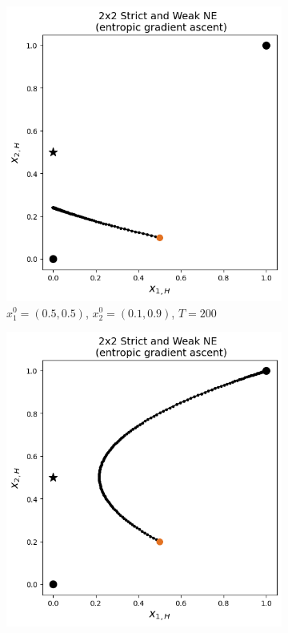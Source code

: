 \begin{figure}[H]
\captionsetup{justification=centering}
\centering
\begin{subfigure}{.5\textwidth}
    \centering
    \includegraphics[width=\textwidth]{logos/Weak5.png}
    \caption{$x_{1}^0 = (0.5,0.5)$, $x_{2}^0 = (0.1,0.9)$, $T = 200$}
    \label{fig:Weak3a}
\end{subfigure}%
\begin{subfigure}{.5\textwidth}
    \centering
    \includegraphics[width=\textwidth]{logos/Weak6.png}

\end{subfigure}
\end{figure}
